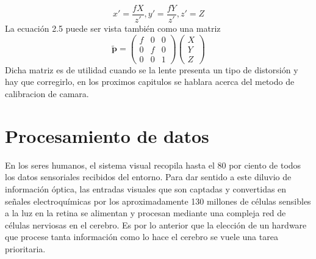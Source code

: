 \begin{equation}
	x' = \frac{fX}{z'}, y' = \frac{fY}{z'}, z' = Z
\end{equation}
La ecuación 2.5 puede ser vista también como una matriz
\begin{equation}
	\tilde{\textbf{p}} = \left(
	\begin{array}{ccc}
			f & 0 & 0 \\
			0 & f & 0 \\
			0 & 0 & 1
		\end{array}
	\right)
	\left(
	\begin{array}{c}
			X \\
			Y \\
			Z
		\end{array}
	\right)
\end{equation}
Dicha matriz es de utilidad cuando se la lente presenta un tipo de distorsión y hay que corregirlo, en los proximos capitulos se
hablara acerca del metodo de calibracion de camara.



\section{Procesamiento de datos}
En los seres humanos, el sistema visual recopila hasta el 80 por ciento de todos los datos sensoriales recibidos del entorno.
Para dar sentido a este diluvio de información óptica, las entradas visuales que son captadas y convertidas en señales
electroquímicas por los aproximadamente 130 millones de células sensibles a la luz en la retina se alimentan y procesan mediante
una compleja red de células nerviosas en el cerebro.\cite{WEB:Cerebro}
Es por lo anterior que la elección de un hardware que procese tanta información como lo hace el cerebro se vuele una tarea
prioritaria.

